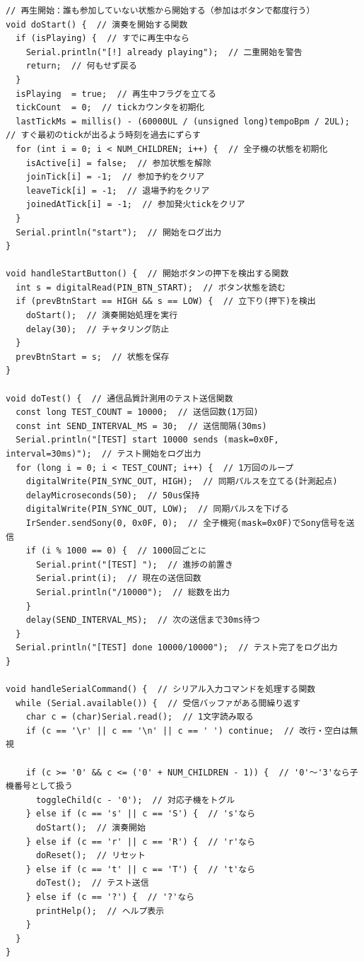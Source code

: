 \documentclass[uplatex,dvipdfmx]{jlreq}
\begin{document}
\begin{lstlisting}
// 再生開始：誰も参加していない状態から開始する（参加はボタンで都度行う）
void doStart() {  // 演奏を開始する関数
  if (isPlaying) {  // すでに再生中なら
    Serial.println("[!] already playing");  // 二重開始を警告
    return;  // 何もせず戻る
  }
  isPlaying  = true;  // 再生中フラグを立てる
  tickCount  = 0;  // tickカウンタを初期化
  lastTickMs = millis() - (60000UL / (unsigned long)tempoBpm / 2UL);  // すぐ最初のtickが出るよう時刻を過去にずらす
  for (int i = 0; i < NUM_CHILDREN; i++) {  // 全子機の状態を初期化
    isActive[i] = false;  // 参加状態を解除
    joinTick[i] = -1;  // 参加予約をクリア
    leaveTick[i] = -1;  // 退場予約をクリア
    joinedAtTick[i] = -1;  // 参加発火tickをクリア
  }
  Serial.println("start");  // 開始をログ出力
}

void handleStartButton() {  // 開始ボタンの押下を検出する関数
  int s = digitalRead(PIN_BTN_START);  // ボタン状態を読む
  if (prevBtnStart == HIGH && s == LOW) {  // 立下り(押下)を検出
    doStart();  // 演奏開始処理を実行
    delay(30);  // チャタリング防止
  }
  prevBtnStart = s;  // 状態を保存
}

void doTest() {  // 通信品質計測用のテスト送信関数
  const long TEST_COUNT = 10000;  // 送信回数(1万回)
  const int SEND_INTERVAL_MS = 30;  // 送信間隔(30ms)
  Serial.println("[TEST] start 10000 sends (mask=0x0F, interval=30ms)");  // テスト開始をログ出力
  for (long i = 0; i < TEST_COUNT; i++) {  // 1万回のループ
    digitalWrite(PIN_SYNC_OUT, HIGH);  // 同期パルスを立てる(計測起点)
    delayMicroseconds(50);  // 50us保持
    digitalWrite(PIN_SYNC_OUT, LOW);  // 同期パルスを下げる
    IrSender.sendSony(0, 0x0F, 0);  // 全子機宛(mask=0x0F)でSony信号を送信
    if (i % 1000 == 0) {  // 1000回ごとに
      Serial.print("[TEST] ");  // 進捗の前置き
      Serial.print(i);  // 現在の送信回数
      Serial.println("/10000");  // 総数を出力
    }
    delay(SEND_INTERVAL_MS);  // 次の送信まで30ms待つ
  }
  Serial.println("[TEST] done 10000/10000");  // テスト完了をログ出力
}

void handleSerialCommand() {  // シリアル入力コマンドを処理する関数
  while (Serial.available()) {  // 受信バッファがある間繰り返す
    char c = (char)Serial.read();  // 1文字読み取る
    if (c == '\r' || c == '\n' || c == ' ') continue;  // 改行・空白は無視

    if (c >= '0' && c <= ('0' + NUM_CHILDREN - 1)) {  // '0'〜'3'なら子機番号として扱う
      toggleChild(c - '0');  // 対応子機をトグル
    } else if (c == 's' || c == 'S') {  // 's'なら
      doStart();  // 演奏開始
    } else if (c == 'r' || c == 'R') {  // 'r'なら
      doReset();  // リセット
    } else if (c == 't' || c == 'T') {  // 't'なら
      doTest();  // テスト送信
    } else if (c == '?') {  // '?'なら
      printHelp();  // ヘルプ表示
    }
  }
}


\end{lstlisting}
\end{document}

